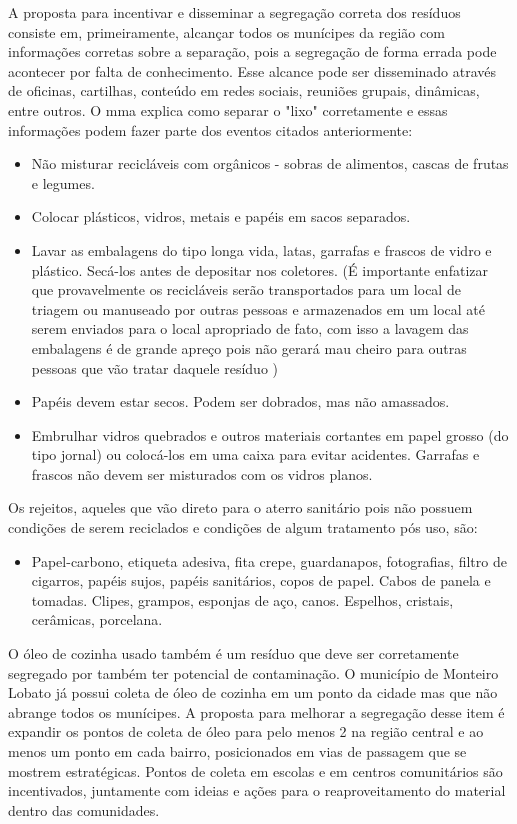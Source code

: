 A proposta para incentivar e disseminar a segregação correta dos resíduos consiste em, primeiramente, alcançar todos os munícipes da região com informações corretas sobre a separação, pois a segregação de forma errada pode acontecer por falta de conhecimento. Esse alcance pode ser disseminado através de oficinas, cartilhas, conteúdo em redes sociais, reuniões grupais, dinâmicas, entre outros. O \gls{mma} explica como separar o "lixo" corretamente e essas informações podem fazer parte dos eventos citados anteriormente:
\begin{itemize}
	\item Não misturar recicláveis com orgânicos - sobras de alimentos, cascas de frutas e legumes. 
	\item Colocar plásticos, vidros, metais e papéis em sacos separados.
	\item Lavar as embalagens do tipo longa vida, latas, garrafas e frascos de vidro e plástico. Secá-los antes de depositar nos coletores. (É importante enfatizar que provavelmente os recicláveis serão transportados para um local de triagem ou manuseado por outras pessoas e armazenados em um local até serem enviados para o local apropriado de fato, com isso a lavagem das embalagens é de grande apreço pois não gerará mau cheiro para outras pessoas que vão tratar daquele resíduo )
	\item Papéis devem estar secos. Podem ser dobrados, mas não amassados.
	\item Embrulhar vidros quebrados e outros materiais cortantes em papel grosso (do tipo jornal) ou colocá-los em uma caixa para evitar acidentes. Garrafas e frascos não devem ser misturados com os vidros planos.	
\end{itemize} 
Os rejeitos, aqueles que vão direto para o aterro sanitário pois não possuem condições de serem reciclados e condições de algum tratamento pós uso, são: 
\begin{itemize}
	\item Papel-carbono, etiqueta adesiva, fita crepe, guardanapos, fotografias, filtro de cigarros, papéis sujos, papéis sanitários, copos de papel. Cabos de panela e tomadas. Clipes, grampos, esponjas de aço, canos. Espelhos, cristais, cerâmicas, porcelana. 
\end{itemize}

O óleo de cozinha usado também é um resíduo que deve ser corretamente segregado por também ter potencial de contaminação. O município de Monteiro Lobato já possui coleta de óleo de cozinha em um ponto da cidade mas que não abrange todos os munícipes. A proposta para melhorar a segregação desse item é expandir os pontos de coleta de óleo para pelo menos 2 na região central e ao menos um ponto em cada bairro, posicionados em vias de passagem que se mostrem estratégicas. Pontos de coleta em escolas e em centros comunitários são incentivados, juntamente com ideias e ações para o reaproveitamento do material dentro das comunidades.   

